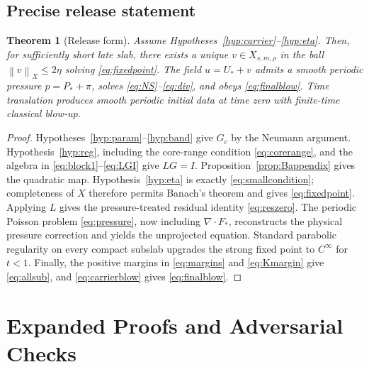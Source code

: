 \documentclass[11pt]{article}
\newtheorem{theorem}{Theorem}[section]
\numberwithin{equation}{section}
\newcommand{\norm}[1]{\left\lVert #1\right\rVert}
\begin{document}
\subsection{Precise release statement}
\begin{theorem}[Release form]\label{thm:release}
Assume Hypotheses~\ref{hyp:carrier}--\ref{hyp:eta}.  Then, for sufficiently short late slab, there exists a unique \(v\in X_{s,m,\rho}\) in the ball \(\norm v_X\le2\eta\) solving \eqref{eq:fixedpoint}.  The field \(u=U_*+v\) admits a smooth periodic pressure \(p=P_*+\pi\), solves \eqref{eq:NS}--\eqref{eq:div}, and obeys \eqref{eq:finalblow}.  Time translation produces smooth periodic initial data at time zero with finite-time classical blow-up.
\end{theorem}
\begin{proof}
Hypotheses~\ref{hyp:param}--\ref{hyp:band} give \(G_c\) by the Neumann argument.  Hypothesis~\ref{hyp:reg}, including the core-range condition \eqref{eq:corerange}, and the algebra in \eqref{eq:block1}--\eqref{eq:LGI} give \(LG=I\).  Proposition~\ref{prop:Bappendix} gives the quadratic map.  Hypothesis~\ref{hyp:eta} is exactly \eqref{eq:smallcondition}; completeness of \(X\) therefore permits Banach's theorem and gives \eqref{eq:fixedpoint}.  Applying \(L\) gives the pressure-treated residual identity \eqref{eq:reszero}.  The periodic Poisson problem \eqref{eq:pressure}, now including \(\nabla\!\cdot F_*\), reconstructs the physical pressure correction and yields the unprojected equation.  Standard parabolic regularity on every compact subslab upgrades the strong fixed point to \(C^\infty\) for \(t<1\).  Finally, the positive margins in \eqref{eq:margins} and \eqref{eq:Kmargin} give \eqref{eq:allsub}, and \eqref{eq:carrierblow} gives \eqref{eq:finalblow}.
\end{proof}

\section{Expanded Proofs and Adversarial Checks}\label{app:proofs}
\end{document}
